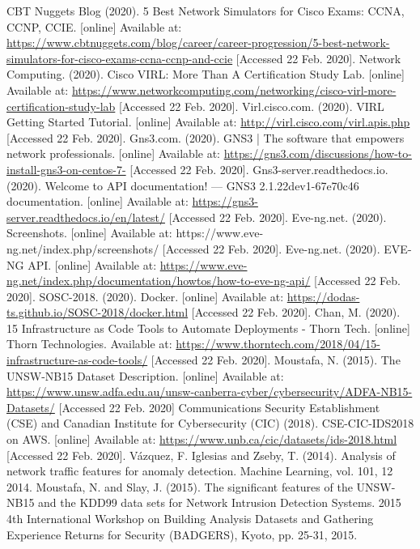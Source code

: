 \documentclass[conference]{IEEEtran}
\begin{document}
\begin{thebibliography}{00}
 CBT Nuggets Blog (2020). 5 Best Network Simulators for Cisco Exams: CCNA, CCNP, CCIE. [online] Available at: \newline\url{https://www.cbtnuggets.com/blog/career/career-progression/5-best-network-simulators-for-cisco-exams-ccna-ccnp-and-ccie} [Accessed 22 Feb. 2020].
 Network Computing. (2020). Cisco VIRL: More Than A Certification Study Lab. [online] Available at: \url{https://www.networkcomputing.com/networking/cisco-virl-more-certification-study-lab} [Accessed 22 Feb. 2020].
 Virl.cisco.com. (2020). VIRL Getting Started Tutorial. [online] Available at: \url{http://virl.cisco.com/virl.apis.php} [Accessed 22 Feb. 2020].
 Gns3.com. (2020). GNS3 | The software that empowers network professionals. [online] Available at: \url{https://gns3.com/discussions/how-to-install-gns3-on-centos-7-} [Accessed 22 Feb. 2020].
 Gns3-server.readthedocs.io. (2020). Welcome to API documentation! — GNS3 2.1.22dev1-67e70c46 documentation. [online] Available at: \url{https://gns3-server.readthedocs.io/en/latest/} [Accessed 22 Feb. 2020].
 Eve-ng.net. (2020). Screenshots. [online] Available at: https://www.eve-ng.net/index.php/screenshots/ [Accessed 22 Feb. 2020].
 Eve-ng.net. (2020). EVE-NG API. [online] Available at: \url{https://www.eve-ng.net/index.php/documentation/howtos/how-to-eve-ng-api/} [Accessed 22 Feb. 2020].
 SOSC-2018. (2020). Docker. [online] Available at: \url{https://dodas-ts.github.io/SOSC-2018/docker.html} [Accessed 22 Feb. 2020].
 Chan, M. (2020). 15 Infrastructure as Code Tools to Automate Deployments - Thorn Tech. [online] Thorn Technologies. Available at: \url{https://www.thorntech.com/2018/04/15-infrastructure-as-code-tools/} [Accessed 22 Feb. 2020].
 Moustafa, N. (2015). The UNSW-NB15 Dataset Description. [online] Available at: \url{https://www.unsw.adfa.edu.au/unsw-canberra-cyber/cybersecurity/ADFA-NB15-Datasets/} [Accessed 22 Feb. 2020]
 Communications Security Establishment (CSE) and Canadian Institute for Cybersecurity (CIC) (2018). CSE-CIC-IDS2018 on AWS. [online] Available at: \url{https://www.unb.ca/cic/datasets/ids-2018.html} [Accessed 22 Feb. 2020].
 Vázquez, F. Iglesias and Zseby, T. (2014). Analysis of network traffic features for anomaly detection. Machine Learning, vol. 101, 12 2014.
 Moustafa, N. and Slay, J. (2015). The significant features of the UNSW-NB15 and the KDD99 data sets for Network Intrusion Detection Systems. 2015 4th International Workshop on Building Analysis Datasets and Gathering Experience Returns for Security (BADGERS), Kyoto, pp. 25-31, 2015.

\end{thebibliography}
\end{document}
